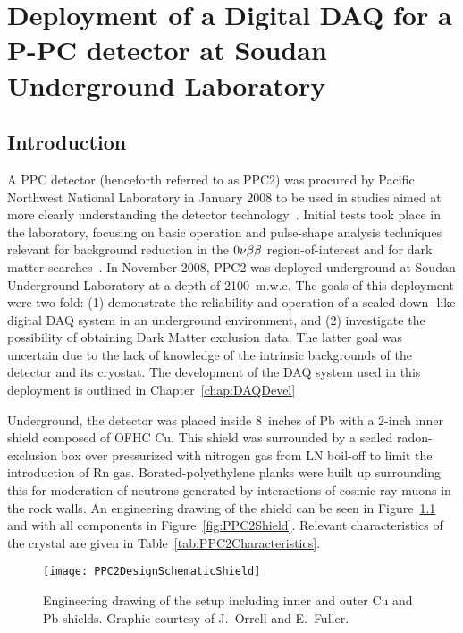 
\chapter{Deployment of a Digital DAQ for a P-PC detector at Soudan Underground Laboratory}
\label{chap:DeploymentPPC2Soudan}
	\section{Introduction}
	\label{sec:DeploymentPPC2SoudanIntro}
			
		A PPC detector (henceforth referred to as PPC2) was procured by Pacific Northwest National Laboratory in January 2008 to be used in studies aimed at more clearly understanding the detector technology~\cite{Orr2007}.  Initial tests took place in the laboratory, focusing on basic operation and pulse-shape analysis techniques relevant for background reduction in the $0 \nu \beta \beta$ region-of-interest and for dark matter searches~\cite{Orr2008}.  In November 2008, PPC2 was deployed underground at Soudan Underground Laboratory at a depth of 2100~m.w.e.  The goals of this deployment were two-fold: (1) demonstrate the reliability and operation of a scaled-down \MJ-like digital DAQ system in an underground environment, and (2) investigate the possibility of obtaining Dark Matter exclusion data.  The latter goal was uncertain due to the lack of knowledge of the intrinsic backgrounds of the detector and its cryostat.  The development of the DAQ system used in this deployment is outlined in Chapter~\ref{chap:DAQDevel}
		
		Underground, the detector was placed inside 8~inches of Pb with a 2-inch inner shield composed of OFHC Cu.  This shield was surrounded by a sealed radon-exclusion box over pressurized with nitrogen gas from LN boil-off to limit the introduction of Rn gas.  Borated-polyethylene planks were built up surrounding this for moderation of neutrons generated by interactions of cosmic-ray muons in the rock walls.  An engineering drawing of the shield can be seen in Figure~\ref{fig:PPC2OnlyShield} and with all components in Figure~\ref{fig:PPC2Shield}.  Relevant characteristics of the crystal are given in Table~\ref{tab:PPC2Characteristics}.
	
			\begin{figure}
				\centering
				\texttt{[image: PPC2DesignSchematicShield]}
				\caption{Engineering drawing of the setup including inner and outer Cu and Pb shields.
				Graphic courtesy of J.~Orrell and E.~Fuller.}
				\label{fig:PPC2OnlyShield}
			\end{figure}
	
